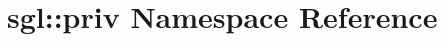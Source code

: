 \hypertarget{namespacesgl_1_1priv}{}\section{sgl\+:\+:priv Namespace Reference}
\label{namespacesgl_1_1priv}
